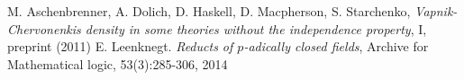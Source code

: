 \documentclass{amsart}
\newcommand{\LLA}{\mathcal L_{aff}}
\DeclareMathOperator{\Sg}{Sg}
\DeclareMathOperator{\Bt}{Bt}
\DeclareMathOperator{\Pt}{Pt}
\DeclareMathOperator{\Ct}{Ct}
\begin{document}
  
  
  
  
  



\begin{thebibliography}{9}
  M. Aschenbrenner, A. Dolich, D. Haskell, D. Macpherson, S. Starchenko,
  \textit{Vapnik-Chervonenkis density in some theories without the independence property}, I, preprint (2011)
  E. Leenknegt. \textit{Reducts of $p$-adically closed fields}, Archive for Mathematical logic, 53(3):285-306, 2014
\end{thebibliography}
\end{document}
